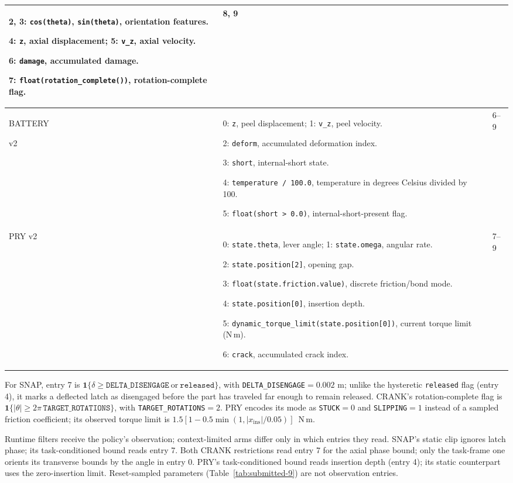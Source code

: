 \documentclass[10pt]{article}
\begin{document}
\begin{longtable}{@{}L{0.75in}L{4.91in}L{0.52in}@{}}
2, 3: \texttt{cos(theta)}, \texttt{sin(theta)}, orientation features.\par
4: \texttt{z}, axial displacement; 5: \texttt{v\_z}, axial velocity.\par
6: \texttt{damage}, accumulated damage.\par
7: \texttt{float(rotation\_complete())}, rotation-complete flag.
& 8, 9\\
\midrule
BATTERY\par v2 &
0: \texttt{z}, peel displacement; 1: \texttt{v\_z}, peel velocity.\par
2: \texttt{deform}, accumulated deformation index.\par
3: \texttt{short}, internal-short state.\par
4: \texttt{temperature / 100.0}, temperature in degrees Celsius divided by 100.\par
5: \texttt{float(short > 0.0)}, internal-short-present flag.
& 6--9\\
\midrule
PRY v2 &
0: \texttt{state.theta}, lever angle; 1: \texttt{state.omega}, angular rate.\par
2: \texttt{state.position[2]}, opening gap.\par
3: \texttt{float(state.friction.value)}, discrete friction/bond mode.\par
4: \texttt{state.position[0]}, insertion depth.\par
5: \texttt{dynamic\_torque\_limit(state.position[0])}, current torque limit (N\,m).\par
6: \texttt{crack}, accumulated crack index.
& 7--9\\
\bottomrule
\end{longtable}
\endgroup

For SNAP, entry 7 is
$\mathbf{1}\{\delta\geq\texttt{DELTA\_DISENGAGE}\ \text{or}\ \texttt{released}\}$,
with \texttt{DELTA\_DISENGAGE}${}=0.002$ m; unlike the hysteretic
\texttt{released} flag (entry 4), it marks a deflected latch as disengaged
before the part has traveled far enough to remain released. CRANK's
rotation-complete flag is
$\mathbf{1}\{|\theta|\geq 2\pi\,\texttt{TARGET\_ROTATIONS}\}$, with
\texttt{TARGET\_ROTATIONS}${}=2$. PRY encodes its mode as
\texttt{STUCK}${}=0$ and \texttt{SLIPPING}${}=1$ instead of a sampled friction coefficient; its observed torque limit is
\mbox{$1.5[1-0.5\min(1,|x_{\mathrm{ins}}|/0.05)]$~N\,m}.

Runtime filters receive the policy's observation; context-limited arms differ
only in which entries they read. SNAP's static clip ignores latch phase; its
task-conditioned bound reads entry 7. Both CRANK restrictions read entry 7 for
the axial phase bound; only the task-frame one orients its transverse bounds
by the angle in entry 0. PRY's task-conditioned bound reads insertion depth
(entry 4); its static counterpart uses the zero-insertion limit.
Reset-sampled parameters (Table~\ref{tab:submitted-9}) are not observation
entries.
\end{document}
